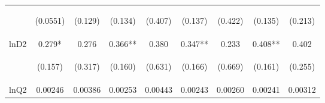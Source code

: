 \documentclass[]{article}
\begin{document}
\begin{center}
\begin{tabular}{lcccccccc}
\vspace{4pt} & \begin{footnotesize}(0.0551)\end{footnotesize} & \begin{footnotesize}(0.129)\end{footnotesize} & \begin{footnotesize}(0.134)\end{footnotesize} & \begin{footnotesize}(0.407)\end{footnotesize} & \begin{footnotesize}(0.137)\end{footnotesize} & \begin{footnotesize}(0.422)\end{footnotesize} & \begin{footnotesize}(0.135)\end{footnotesize} & \begin{footnotesize}(0.213)\end{footnotesize} \\
lnD2 & 0.279* & 0.276 & 0.366** & 0.380 & 0.347** & 0.233 & 0.408** & 0.402 \\
\vspace{4pt} & \begin{footnotesize}(0.157)\end{footnotesize} & \begin{footnotesize}(0.317)\end{footnotesize} & \begin{footnotesize}(0.160)\end{footnotesize} & \begin{footnotesize}(0.631)\end{footnotesize} & \begin{footnotesize}(0.166)\end{footnotesize} & \begin{footnotesize}(0.669)\end{footnotesize} & \begin{footnotesize}(0.161)\end{footnotesize} & \begin{footnotesize}(0.255)\end{footnotesize} \\
lnQ2 & 0.00246 & 0.00386 & 0.00253 & 0.00443 & 0.00243 & 0.00260 & 0.00241 & 0.00312 \\

\end{tabular}
\end{center}
\end{document}
